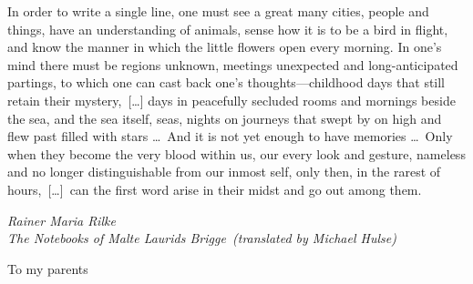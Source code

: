 
\begin{dedication} 
\setlength{\epigraphwidth}{0.8\textwidth}

\epigraph{%
	In order to write a single line, one must see a great many cities, people and things, have an understanding of animals, sense how it is to be a bird in flight, and know the manner in which the little flowers open every morning. In one's mind there must be regions unknown, meetings unexpected and long-anticipated partings, to which one can cast back one's thoughts---childhood days that still retain their mystery,~[\dots] days in peacefully secluded rooms and mornings beside the sea, and the sea itself, seas, nights on journeys that swept by on high and flew past filled with stars \dots~And it is not yet enough to have memories \dots~Only when they become the very blood within us, our every look and gesture, nameless and no longer distinguishable from our inmost self, only then, in the rarest of hours,~[\dots]~can the first word arise in their midst and go out among them.}{\textit{Rainer Maria Rilke\\ The Notebooks of Malte Laurids Brigge~(translated by Michael Hulse)}}

\vspace{5cm}
To my parents




\end{dedication}

